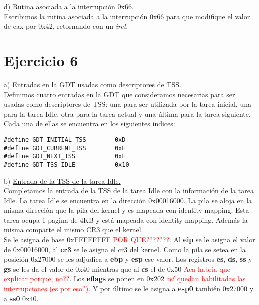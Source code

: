 \documentclass[a4paper]{article}
\begin{document}
{\large d)} \underline{Rutina asociada a la interrupci\'on 0x66.}\\


Escribimos la rutina asociada a la interrupci\'on 0x66 para que modifique el valor de eax por
0x42, retornando con un \textit{iret}. 

\newpage
\section{Ejercicio 6}
{\large a)} \underline{Entradas en la GDT usadas como descriptores de TSS.}\\

Definimos cuatro entradas en la GDT que consideramos necesarias para ser usadas como descriptores
de TSS: una para ser utilizada por la tarea inicial, una para la tarea Idle, otra para la tarea actual y una \'ultima para la tarea siguiente.\\

Cada una de ellas se encuentra en los siguientes \'indices: 
\begin{codesnippet}
\begin{verbatim}
#define GDT_INITIAL_TSS        0xD
#define GDT_CURRENT_TSS        0xE
#define GDT_NEXT_TSS           0xF
#define GDT_TSS_IDLE           0x10
\end{verbatim}
\end{codesnippet}
\bigskip



{\large b)} \underline{Entrada de la TSS de la tarea Idle.}\\

Completamos la entrada de la TSS de la tarea Idle con la informaci\'on de la tarea Idle. La tarea Idle se encuentra en la direcci\'on 0x00016000. La pila se aloja en la misma direcci\'on que la pila del kernel y es mapeada con identity mapping. Esta tarea ocupa 1 pagina de 4KB y est\'a mapeada con identity mapping. Adem\'as la misma comparte el mismo CR3 que el kernel. \\

Se le asigna de base 0xFFFFFFFF \textcolor{red}{POR QUE???????}. Al \textbf{eip} se le asigna el valor de 0x00016000, al \textbf{cr3} se le asigna el cr3 del kernel. Como la pila se setea en la posici\'on 0x27000 se les adjudica a \textbf{ebp} y \textbf{esp} ese valor. Los registros \textbf{es}, \textbf{ds}, \textbf{ss} y \textbf{gs} se les da el valor de 0x40 mientras que al \textbf{cs} el de 0x50 \textcolor{red}{Aca habria que explicar porque, no??}. Los \textbf{eflags} se ponen en 0x202 \textcolor{red}{as\'i quedan habilitadas las interrupciones (es por eso?)}. Y por \'ultimo se le asigna a \textbf{esp0} tambi\'en 0x27000 y a \textbf{ss0} 0x40.\\
\bigskip
\end{document}
